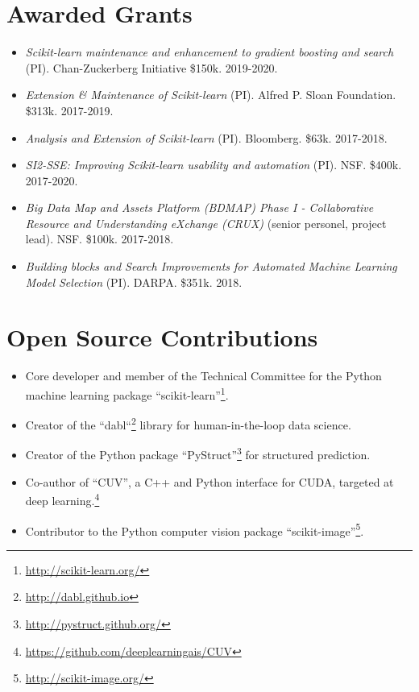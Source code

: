 \documentclass[a4paper,11pt]{article}
\begin{document}
\section{Awarded Grants}
\begin{itemize}
    \item \emph{Scikit-learn maintenance and enhancement to gradient boosting and search} (PI). Chan-Zuckerberg Initiative \$150k. 2019-2020.
    \item \emph{Extension \& Maintenance of Scikit-learn} (PI). Alfred P. Sloan Foundation. \$313k. 2017-2019.
    \item \emph{Analysis and Extension of Scikit-learn} (PI). Bloomberg. \$63k. 2017-2018.
    \item \emph{SI2-SSE: Improving Scikit-learn usability and automation} (PI). NSF. \$400k. 2017-2020.
    \item \emph{Big Data Map and Assets Platform (BDMAP) Phase I - Collaborative Resource and Understanding eXchange (CRUX)} (senior personel, project lead). NSF. \$100k. 2017-2018.
    \item \emph{Building blocks and Search Improvements for Automated Machine Learning Model Selection} (PI). DARPA. \$351k. 2018.
\end{itemize}

\pagebreak

\section{Open Source Contributions}
\begin{itemize}
    \item Core developer and member of the Technical Committee for the Python machine learning package ``scikit-learn''\footnote{\url{http://scikit-learn.org/}}.
    \item Creator of the ``dabl``\footnote{\url{http://dabl.github.io}} library for human-in-the-loop data science.
    \item Creator of the Python package ``PyStruct''\footnote{\url{http://pystruct.github.org/}} for structured prediction.
    \item Co-author of ``CUV'', a C++ and Python interface for CUDA,
        targeted at deep learning.\footnote{\url{https://github.com/deeplearningais/CUV}}
    \item Contributor to the Python computer vision package ``scikit-image''\footnote{\url{http://scikit-image.org/}}.
\end{itemize}
\end{document}
